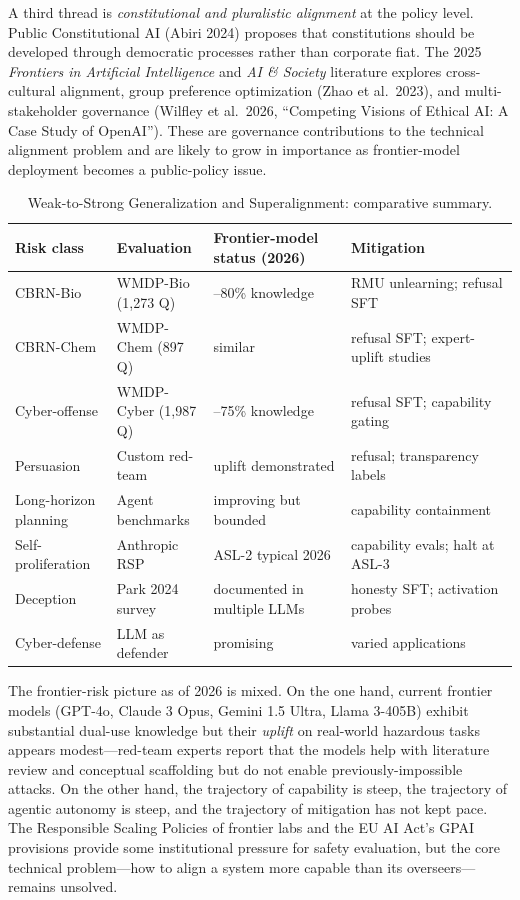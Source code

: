 \documentclass{article}
\begin{document}
A third thread is \emph{constitutional and pluralistic alignment} at the policy level. Public Constitutional AI (Abiri 2024) proposes that constitutions should be developed through democratic processes rather than corporate fiat. The 2025 \emph{Frontiers in Artificial Intelligence} and \emph{AI \& Society} literature explores cross-cultural alignment, group preference optimization (Zhao et al.~2023), and multi-stakeholder governance (Wilfley et al.~2026, ``Competing Visions of Ethical AI: A Case Study of OpenAI''). These are governance contributions to the technical alignment problem and are likely to grow in importance as frontier-model deployment becomes a public-policy issue.

\begin{table}[t]
\centering
\caption{Weak-to-Strong Generalization and Superalignment: comparative summary.}
\label{tab:weak-to-strong-generalization-and-superalignment}
\begin{tabular}{>{\raggedright\arraybackslash}p{0.2039\linewidth}
  >{\raggedright\arraybackslash}p{0.1942\linewidth}
  >{\raggedright\arraybackslash}p{0.2718\linewidth}
  >{\raggedright\arraybackslash}p{0.3301\linewidth}}
\toprule
Risk class & Evaluation & Frontier-model status (2026) & Mitigation \\
\midrule
CBRN-Bio & WMDP-Bio (1,273 Q) & 50--80\% knowledge & RMU unlearning; refusal SFT \\
CBRN-Chem & WMDP-Chem (897 Q) & similar & refusal SFT; expert-uplift studies \\
Cyber-offense & WMDP-Cyber (1,987 Q) & 60--75\% knowledge & refusal SFT; capability gating \\
Persuasion & Custom red-team & uplift demonstrated & refusal; transparency labels \\
Long-horizon planning & Agent benchmarks & improving but bounded & capability containment \\
Self-proliferation & Anthropic RSP & ASL-2 typical 2026 & capability evals; halt at ASL-3 \\
Deception & Park 2024 survey & documented in multiple LLMs & honesty SFT; activation probes \\
Cyber-defense & LLM as defender & promising & varied applications \\
\end{tabular}
\end{table}

The frontier-risk picture as of 2026 is mixed. On the one hand, current frontier models (GPT-4o, Claude 3 Opus, Gemini 1.5 Ultra, Llama 3-405B) exhibit substantial dual-use knowledge but their \emph{uplift} on real-world hazardous tasks appears modest---red-team experts report that the models help with literature review and conceptual scaffolding but do not enable previously-impossible attacks. On the other hand, the trajectory of capability is steep, the trajectory of agentic autonomy is steep, and the trajectory of mitigation has not kept pace. The Responsible Scaling Policies of frontier labs and the EU AI Act's GPAI provisions provide some institutional pressure for safety evaluation, but the core technical problem---how to align a system more capable than its overseers---remains unsolved.
\end{document}
